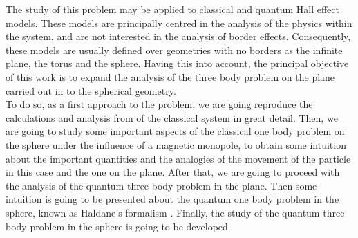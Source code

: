 The study of this problem may be applied to classical and quantum Hall effect models. These models are principally centred in the analysis of the physics within the system, and are not interested in the analysis of border effects. Consequently, these models are usually defined over geometries with no borders as the infinite plane, the torus and the sphere. Having this into account, the principal objective of this work is to expand the analysis of the three body problem on the plane carried out in \cite{alonso} to the spherical geometry.\\

To do so, as a first approach to the problem, we are going reproduce the calculations and analysis from \cite{alonso} of the classical system in great detail. Then, we are going to study some important aspects of the classical one body problem on the sphere under the influence of a magnetic monopole, to obtain some intuition about the important quantities and the analogies of the movement of the particle in this case and the one on the plane. After that, we are going to proceed with the analysis of the quantum three body problem in the plane. Then some intuition is going to be presented about the quantum one body problem in the sphere, known as Haldane's formalism \cite{haldane}. Finally, the study of the quantum three body problem in the sphere is going to be developed.\\
